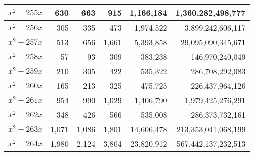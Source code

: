 \documentclass{article}
\begin{document}
\begin{center}
\begin{tabular}{ | c | r | r | r | r | r | }
$x^2 + 255x$ & 630 & 663 & 915 & 1{,}166{,}184 & 1{,}360{,}282{,}498{,}777 \\ \hline
$x^2 + 256x$ & 305 & 335 & 473 & 1{,}974{,}522 & 3{,}899{,}242{,}606{,}117 \\ \hline
$x^2 + 257x$ & 513 & 656 & 1{,}661 & 5{,}393{,}858 & 29{,}095{,}090{,}345{,}671 \\ \hline
$x^2 + 258x$ & 57 & 93 & 309 & 383{,}238 & 146{,}970{,}240{,}049 \\ \hline
$x^2 + 259x$ & 210 & 305 & 422 & 535{,}322 & 286{,}708{,}292{,}083 \\ \hline
$x^2 + 260x$ & 165 & 213 & 325 & 475{,}725 & 226{,}437{,}964{,}126 \\ \hline
$x^2 + 261x$ & 954 & 990 & 1{,}029 & 1{,}406{,}790 & 1{,}979{,}425{,}276{,}291 \\ \hline
$x^2 + 262x$ & 348 & 426 & 566 & 535{,}008 & 286{,}373{,}732{,}161 \\ \hline
$x^2 + 263x$ & 1{,}071 & 1{,}086 & 1{,}801 & 14{,}606{,}478 & 213{,}353{,}041{,}068{,}199 \\ \hline
$x^2 + 264x$ & 1{,}980 & 2{,}124 & 3{,}804 & 23{,}820{,}912 & 567{,}442{,}137{,}232{,}513 \\ \hline

\end{tabular}\pagebreak

\begin{tabular}{ | c | r | r | r | r | r | }
\hline


\end{tabular}
\end{center}
\end{document}
